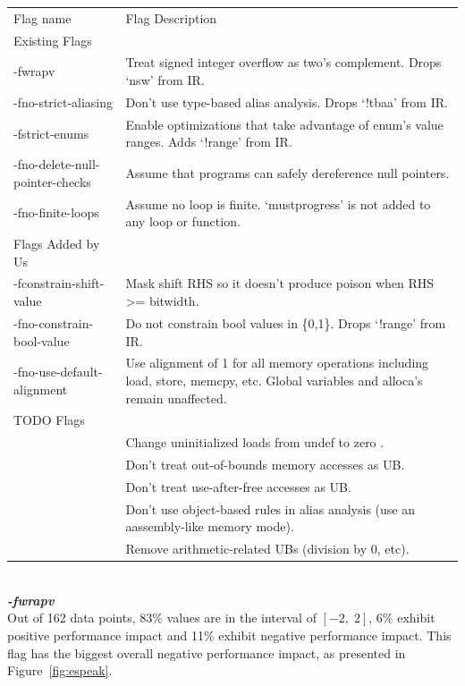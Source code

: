\documentclass{sciposter}
\begin{document}
\begin{multicols}{3}
\begin{tabular}{p{8cm}|p{15cm}|}
\rowcolor{gray!50}
Flag name & Flag Description\\
Existing Flags & \\
-fwrapv & Treat signed integer overflow as two's complement. Drops `nsw' from IR.\\
-fno-strict-aliasing & Don't use type-based alias analysis. Drops `!tbaa' from IR. \\
-fstrict-enums & Enable optimizations that take advantage of enum's value ranges. Adds `!range' from IR.\\
-fno-delete-null-pointer-checks & Assume that programs can safely dereference null pointers. \\
-fno-finite-loops & Assume no loop is finite. `mustprogress' is not added to any loop or function.\\
Flags Added by Us & \\
-fconstrain-shift-value & Mask shift RHS so it doesn't produce poison when RHS >= bitwidth. \\
-fno-constrain-bool-value & Do not constrain bool values in \{0,1\}. Drops `!range' from IR.\\
-fno-use-default-alignment & Use alignment of 1 for all memory operations including load, store, memcpy, etc. Global variables and alloca's remain unaffected.\\
TODO Flags & \\
& Change uninitialized loads from undef to zero . \\
& Don't treat out-of-bounds memory accesses as UB. \\
& Don't treat use-after-free accesses as UB.\\
& Don't use object-based rules in alias analysis (use an aassembly-like memory mode). \\
& Remove arithmetic-related UBs (division by 0, etc). \\
\end{tabular} \\

\textbf{\textit{-fwrapv}} \\
Out of 162 data points, 83\% values are in the interval of \( [-2,\;2] \), 
6\% exhibit positive performance impact and 11\% exhibit negative
performance impact. This flag has the biggest overall negative 
performance impact, as presented in Figure~\ref{fig:espeak}.


\end{multicols}
\end{document}
